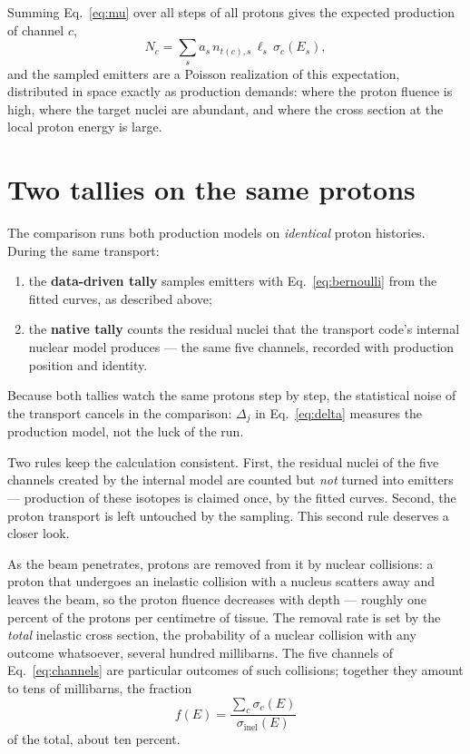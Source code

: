 \documentclass[11pt]{article}
\begin{document}
Summing Eq.~\eqref{eq:mu} over all steps of all protons gives the expected
production of channel $c$,
\begin{equation}
  N_c = \sum_{s} a_s\, n_{t(c),s}\,\ell_s\,\sigma_c(E_s),
  \label{eq:total}
\end{equation}
and the sampled emitters are a Poisson realization of this expectation,
distributed in space exactly as production demands: where the proton fluence
is high, where the target nuclei are abundant, and where the cross section at
the local proton energy is large.

\section{Two tallies on the same protons}

The comparison runs both production models on \emph{identical} proton
histories.  During the same transport:
\begin{enumerate}[nosep]
  \item the \textbf{data-driven tally} samples emitters with
        Eq.~\eqref{eq:bernoulli} from the fitted curves, as described above;
  \item the \textbf{native tally} counts the residual nuclei that the
        transport code's internal nuclear model produces --- the same five
        channels, recorded with production position and identity.
\end{enumerate}
Because both tallies watch the same protons step by step, the statistical
noise of the transport cancels in the comparison: $\Delta_j$ in
Eq.~\eqref{eq:delta} measures the production model, not the luck of the run.

Two rules keep the calculation consistent.  First, the residual nuclei of
the five channels created by the internal model are counted but \emph{not}
turned into emitters --- production of these isotopes is claimed once, by the
fitted curves.  Second, the proton transport is left untouched by the
sampling.  This second rule deserves a closer look.

As the beam penetrates, protons are removed from it by nuclear collisions:
a proton that undergoes an inelastic collision with a nucleus scatters away
and leaves the beam, so the proton fluence decreases with depth --- roughly
one percent of the protons per centimetre of tissue.  The removal rate is
set by the \emph{total} inelastic cross section, the probability of a
nuclear collision with any outcome whatsoever, several hundred millibarns.
The five channels of Eq.~\eqref{eq:channels} are particular outcomes of
such collisions; together they amount to tens of millibarns, the fraction
\begin{equation}
  f(E)=\frac{\sum_c\sigma_c(E)}{\sigma_{\mathrm{inel}}(E)}
  \label{eq:fraction}
\end{equation}
of the total, about ten percent.
\end{document}
